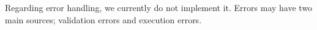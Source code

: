 Regarding error handling, we currently do not implement it. Errors may have two main sources; validation errors and execution errors.

\fi


